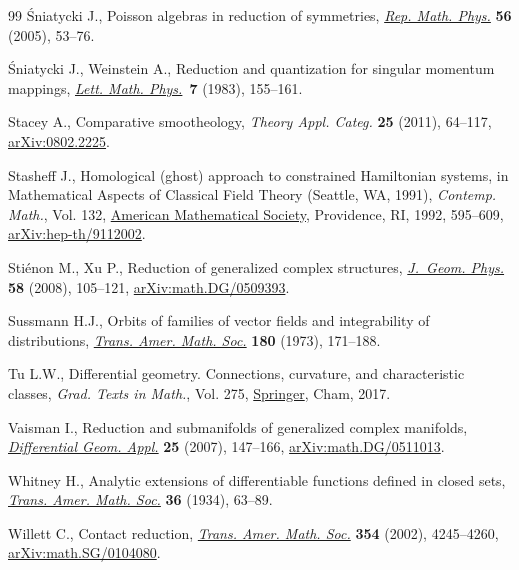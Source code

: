\documentclass[pdftex]{sigma}
\numberwithin{equation}{section}
\begin{document}
\begin{thebibliography}{99}
\'Sniatycki J., Poisson algebras in reduction of symmetries, \href{https://doi.org/10.1016/S0034-4877(05)80041-2}{\textit{Rep. Math.
  Phys.}} \textbf{56} (2005), 53--76.

\'Sniatycki J., Weinstein A., Reduction and quantization for singular momentum
  mappings, \href{https://doi.org/10.1007/BF00419934}{\textit{Lett. Math. Phys.}}~\textbf{7} (1983), 155--161.

Stacey A., Comparative smootheology, \textit{Theory Appl. Categ.} \textbf{25}
  (2011), 64--117, \href{https://arxiv.org/abs/0802.2225}{arXiv:0802.2225}.

Stasheff J., Homological (ghost) approach to constrained {H}amiltonian systems,
  in Mathematical Aspects of Classical Field Theory ({S}eattle, {WA}, 1991),
  \textit{Contemp. Math.}, Vol. 132, \href{https://doi.org/10.1090/conm/132/1188459}{American Mathematical Society}, Providence,
  RI, 1992, 595--609, \href{https://arxiv.org/abs/hep-th/9112002}{arXiv:hep-th/9112002}.

Sti\'enon M., Xu P., Reduction of generalized complex structures,
  \href{https://doi.org/10.1016/j.geomphys.2007.09.009}{\textit{J.~Geom. Phys.}} \textbf{58} (2008), 105--121,
  \href{https://arxiv.org/abs/math.DG/0509393}{arXiv:math.DG/0509393}.

Sussmann H.J., Orbits of families of vector fields and integrability of
  distributions, \href{https://doi.org/10.2307/1996660}{\textit{Trans. Amer. Math. Soc.}} \textbf{180} (1973),
  171--188.

Tu L.W., Differential geometry. Connections, curvature, and characteristic
  classes, \textit{Grad. Texts in Math.}, Vol. 275, \href{https://doi.org/10.1007/978-3-319-55084-8}{Springer}, Cham, 2017.

Vaisman I., Reduction and submanifolds of generalized complex manifolds,
  \href{https://doi.org/10.1016/j.difgeo.2006.08.007}{\textit{Differential Geom. Appl.}} \textbf{25} (2007), 147--166,
  \href{https://arxiv.org/abs/math.DG/0511013}{arXiv:math.DG/0511013}.

Whitney H., Analytic extensions of differentiable functions defined in closed
  sets, \href{https://doi.org/10.2307/1989708}{\textit{Trans. Amer. Math. Soc.}} \textbf{36} (1934), 63--89.

Willett C., Contact reduction, \href{https://doi.org/10.1090/S0002-9947-02-03045-3}{\textit{Trans. Amer. Math. Soc.}} \textbf{354}
  (2002), 4245--4260, \href{https://arxiv.org/abs/math.SG/0104080}{arXiv:math.SG/0104080}.

\end{thebibliography}\LastPageEnding
\end{document}
